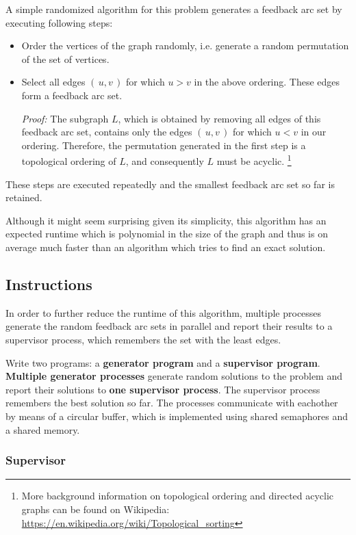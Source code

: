 A simple randomized algorithm for this problem generates a feedback arc set
by executing following steps:

\begin{itemize}
\item Order the vertices of the graph randomly,
i.e. generate a random permutation of the set of vertices.

\item Select all edges $(\,u,v\,)$ for which $u>v$ in the above ordering.
These edges form a feedback arc set.

\emph{Proof:}
The subgraph $L$, which is obtained by removing all edges of this feedback arc set,
contains only the edges $(\,u,v\,)$ for which $u<v$ in our ordering.
Therefore, the permutation generated in the first step is a topological ordering of $L$,
and consequently $L$ must be acyclic.
\footnote{
More background information on topological ordering and directed acyclic graphs can be found on Wikipedia:\\
\url{https://en.wikipedia.org/wiki/Topological_sorting}
}
\end{itemize}

These steps are executed repeatedly and the smallest feedback arc set so far is retained.

Although it might seem surprising given its simplicity,
this algorithm has an expected runtime which is polynomial in the size of the graph
and thus is on average much faster than an algorithm which tries to find an exact solution.

\clearpage
\subsection*{Instructions}

In order to further reduce the runtime of this algorithm,
multiple processes generate the random feedback arc sets in parallel
and report their results to a supervisor process,
which remembers the set with the least edges.

Write two programs: a \textbf{generator program} and a \textbf{supervisor program}.
\textbf{Multiple generator processes} generate random solutions to the problem
and report their solutions to \textbf{one supervisor process}.
The supervisor process remembers the best solution so far.
The processes communicate with eachother by means of a circular buffer,
which is implemented using shared semaphores and a shared memory.

\subsubsection*{Supervisor}

